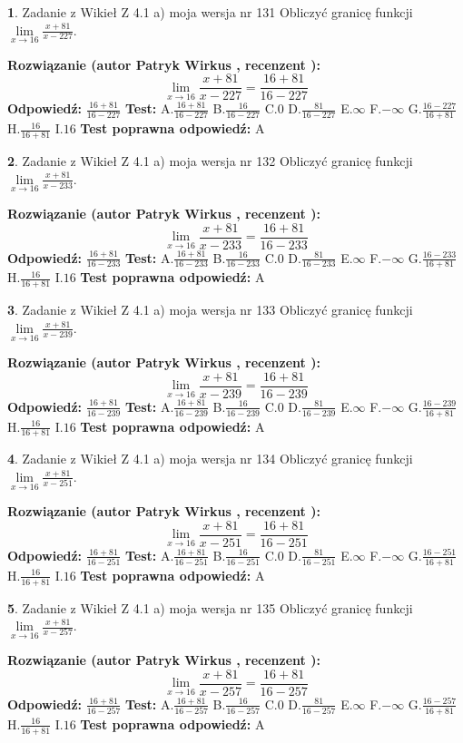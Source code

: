 \documentclass[12pt, a4paper]{article}
\theoremstyle{definition} %
\newtheorem{zad}{}
\newcommand{\zadStart}[1]{\begin{zad}#1\newline}
\newcommand{\zadStop}{\end{zad}}
\newcommand{\rozwStart}[2]{\noindent \textbf{Rozwiązanie (autor #1 , recenzent #2): }\newline}
\newcommand{\rozwStop}{\newline}
\newcommand{\odpStart}{\noindent \textbf{Odpowiedź:}\newline}
\newcommand{\odpStop}{\newline}
\newcommand{\testStart}{\noindent \textbf{Test:}\newline}
\newcommand{\testStop}{\newline}
\newcommand{\kluczStart}{\noindent \textbf{Test poprawna odpowiedź:}\newline}
\newcommand{\kluczStop}{\newline}
\begin{document}
\zadStart{Zadanie z Wikieł Z 4.1 a) moja wersja nr 131}
Obliczyć granicę funkcji $\lim\limits_{x\to16}\frac{x+81}{x-227}$.
\zadStop
\rozwStart{Patryk Wirkus}{}
$$\lim\limits_{x\to16}\frac{x+81}{x-227} = \frac{16+81}{16-227}$$
\rozwStop
\odpStart
$\frac{16+81}{16-227}$
\odpStop
\testStart
A.$\frac{16+81}{16-227}$
B.$\frac{16}{16-227}$
C.$0$
D.$\frac{81}{16-227}$
E.$\infty$
F.$-\infty$
G.$\frac{16-227}{16+81}$
H.$\frac{16}{16+81}$
I.$16$
\testStop
\kluczStart
A
\kluczStop



\zadStart{Zadanie z Wikieł Z 4.1 a) moja wersja nr 132}
Obliczyć granicę funkcji $\lim\limits_{x\to16}\frac{x+81}{x-233}$.
\zadStop
\rozwStart{Patryk Wirkus}{}
$$\lim\limits_{x\to16}\frac{x+81}{x-233} = \frac{16+81}{16-233}$$
\rozwStop
\odpStart
$\frac{16+81}{16-233}$
\odpStop
\testStart
A.$\frac{16+81}{16-233}$
B.$\frac{16}{16-233}$
C.$0$
D.$\frac{81}{16-233}$
E.$\infty$
F.$-\infty$
G.$\frac{16-233}{16+81}$
H.$\frac{16}{16+81}$
I.$16$
\testStop
\kluczStart
A
\kluczStop



\zadStart{Zadanie z Wikieł Z 4.1 a) moja wersja nr 133}
Obliczyć granicę funkcji $\lim\limits_{x\to16}\frac{x+81}{x-239}$.
\zadStop
\rozwStart{Patryk Wirkus}{}
$$\lim\limits_{x\to16}\frac{x+81}{x-239} = \frac{16+81}{16-239}$$
\rozwStop
\odpStart
$\frac{16+81}{16-239}$
\odpStop
\testStart
A.$\frac{16+81}{16-239}$
B.$\frac{16}{16-239}$
C.$0$
D.$\frac{81}{16-239}$
E.$\infty$
F.$-\infty$
G.$\frac{16-239}{16+81}$
H.$\frac{16}{16+81}$
I.$16$
\testStop
\kluczStart
A
\kluczStop



\zadStart{Zadanie z Wikieł Z 4.1 a) moja wersja nr 134}
Obliczyć granicę funkcji $\lim\limits_{x\to16}\frac{x+81}{x-251}$.
\zadStop
\rozwStart{Patryk Wirkus}{}
$$\lim\limits_{x\to16}\frac{x+81}{x-251} = \frac{16+81}{16-251}$$
\rozwStop
\odpStart
$\frac{16+81}{16-251}$
\odpStop
\testStart
A.$\frac{16+81}{16-251}$
B.$\frac{16}{16-251}$
C.$0$
D.$\frac{81}{16-251}$
E.$\infty$
F.$-\infty$
G.$\frac{16-251}{16+81}$
H.$\frac{16}{16+81}$
I.$16$
\testStop
\kluczStart
A
\kluczStop



\zadStart{Zadanie z Wikieł Z 4.1 a) moja wersja nr 135}
Obliczyć granicę funkcji $\lim\limits_{x\to16}\frac{x+81}{x-257}$.
\zadStop
\rozwStart{Patryk Wirkus}{}
$$\lim\limits_{x\to16}\frac{x+81}{x-257} = \frac{16+81}{16-257}$$
\rozwStop
\odpStart
$\frac{16+81}{16-257}$
\odpStop
\testStart
A.$\frac{16+81}{16-257}$
B.$\frac{16}{16-257}$
C.$0$
D.$\frac{81}{16-257}$
E.$\infty$
F.$-\infty$
G.$\frac{16-257}{16+81}$
H.$\frac{16}{16+81}$
I.$16$
\testStop
\kluczStart
A
\kluczStop
\end{document}

